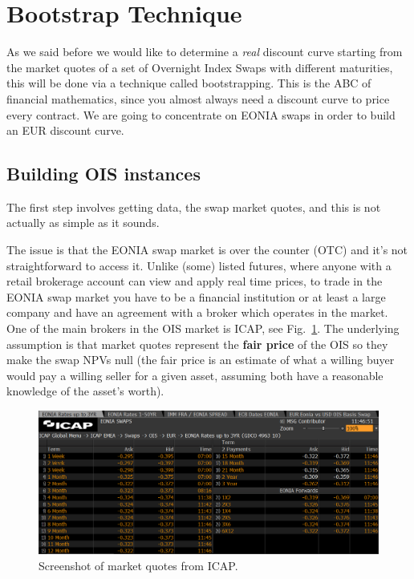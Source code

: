 \section{Bootstrap Technique}\label{bootstrapping-technique}

As we said before we would like to determine a \emph{real} discount
curve starting from the market quotes of a set of Overnight Index Swaps
with different maturities, this will be done via a technique called
bootstrapping. This is the ABC of financial mathematics, since you
almost always need a discount curve to price every contract. We are
going to concentrate on EONIA swaps in order to build an EUR discount
curve.

\subsection{Building OIS instances}\label{building-ois-instances}

The first step involves getting data, the swap market quotes, and this is not actually as simple as it sounds.

The issue is that the EONIA swap market is over the counter (OTC) and it's not straightforward to access it. Unlike (some) listed futures, where anyone with a retail brokerage account can view and apply real time prices, to trade in the EONIA swap market you have to be a financial institution or at least a large company and have an agreement with a broker which operates in the market. One of the main brokers in the OIS market is ICAP, see Fig.~\ref{fig:icap}.
The underlying assumption is that market quotes represent the \textbf{fair price} of the OIS so they make the swap NPVs null (the fair price is an estimate of what a willing buyer would pay a willing seller for a given asset, assuming both have a reasonable knowledge of the asset's worth).

\begin{figure}[bth]
  \centering
\includegraphics[width=1.\linewidth]{icap_3.png}
\caption{Screenshot of market quotes from ICAP.}
\label{fig:icap}
\end{figure}

